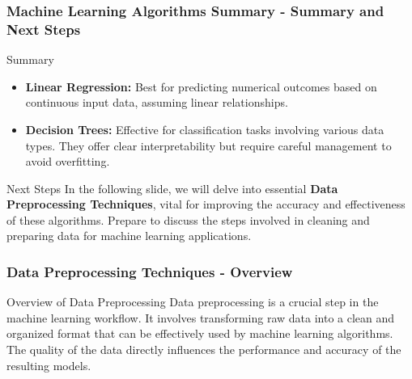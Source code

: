 \documentclass[aspectratio=169]{beamer}
\begin{document}
\begin{frame}[fragile]
    \frametitle{Machine Learning Algorithms Summary - Summary and Next Steps}
    \begin{block}{Summary}
        \begin{itemize}
            \item \textbf{Linear Regression:} Best for predicting numerical outcomes based on continuous input 
            data, assuming linear relationships.
            
            \item \textbf{Decision Trees:} Effective for classification tasks involving various data types. 
            They offer clear interpretability but require careful management to avoid overfitting.
        \end{itemize}
    \end{block}
    
    \begin{block}{Next Steps}
        In the following slide, we will delve into essential \textbf{Data Preprocessing Techniques}, vital for 
        improving the accuracy and effectiveness of these algorithms. Prepare to discuss the steps involved in 
        cleaning and preparing data for machine learning applications.
    \end{block}
\end{frame}

\begin{frame}[fragile]
    \frametitle{Data Preprocessing Techniques - Overview}
    \begin{block}{Overview of Data Preprocessing}
        Data preprocessing is a crucial step in the machine learning workflow. It involves transforming raw data into a clean and organized format that can be effectively used by machine learning algorithms.
        The quality of the data directly influences the performance and accuracy of the resulting models.
    \end{block}
\end{frame}
\end{document}
